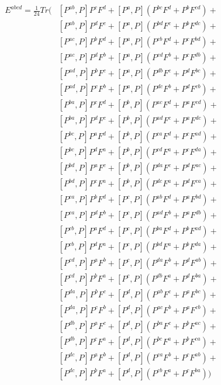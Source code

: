 \documentclass[twocolumn,showpacs,preprintnumbers,amsmath,amssymb]{revtex4}
\begin{document}
\begin{equation}
\begin{split}
E^{abcd}=\frac{1}{24}Tr(&[P^{ab},P] P^c F^d +[P^a,P](P^{bc} F^d + P^b F^{cd})+\\
                        &[P^{ab},P] P^d F^c +[P^a,P](P^{bd} F^c + P^b F^{dc})+\\
                        &[P^{ac},P] P^b F^d +[P^a,P](P^{cb} F^d + P^c F^{bd})+\\
                        &[P^{ac},P] P^d F^b +[P^a,P](P^{cd} F^b + P^c F^{db})+\\
                        &[P^{ad},P] P^b F^c +[P^a,P](P^{db} F^c + P^d F^{bc})+\\
                        &[P^{ad},P] P^c F^b +[P^a,P](P^{dc} F^b + P^d F^{cb})+\\
%
                        &[P^{ba},P] P^c F^d +[P^b,P](P^{ac} F^d + P^a F^{cd})+\\
                        &[P^{ba},P] P^d F^c +[P^b,P](P^{ad} F^c + P^a F^{dc})+\\
                        &[P^{bc},P] P^a F^d +[P^b,P](P^{ca} F^d + P^c F^{ad})+\\
                        &[P^{bc},P] P^d F^a +[P^b,P](P^{cd} F^a + P^c F^{da})+\\
                        &[P^{bd},P] P^a F^c +[P^b,P](P^{da} F^c + P^d F^{ac})+\\
                        &[P^{bd},P] P^c F^a +[P^b,P](P^{dc} F^a + P^d F^{ca})+\\
%
                        &[P^{ca},P] P^b F^d +[P^c,P](P^{ab} F^d + P^a F^{bd})+\\
                        &[P^{ca},P] P^d F^b +[P^c,P](P^{ad} F^b + P^a F^{db})+\\
                        &[P^{cb},P] P^a F^d +[P^c,P](P^{ba} F^d + P^b F^{ad})+\\
                        &[P^{cb},P] P^d F^a +[P^c,P](P^{bd} F^a + P^b F^{da})+\\
                        &[P^{cd},P] P^a F^b +[P^c,P](P^{da} F^b + P^d F^{ab})+\\
                        &[P^{cd},P] P^b F^a +[P^c,P](P^{db} F^a + P^d F^{ba})+\\
%
                        &[P^{da},P] P^b F^c +[P^d,P](P^{ab} F^c + P^a F^{bc})+\\
                        &[P^{da},P] P^c F^b +[P^d,P](P^{ac} F^b + P^a F^{cb})+\\
                        &[P^{db},P] P^a F^c +[P^d,P](P^{ba} F^c + P^b F^{ac})+\\
                        &[P^{db},P] P^c F^a +[P^d,P](P^{bc} F^a + P^b F^{ca})+\\
                        &[P^{dc},P] P^a F^b +[P^d,P](P^{ca} F^b + P^c F^{ab})+\\
                        &[P^{dc},P] P^b F^a +[P^d,P](P^{cb} F^a + P^c F^{ba}))\\
\end{split}
\end{equation}
\end{document}
